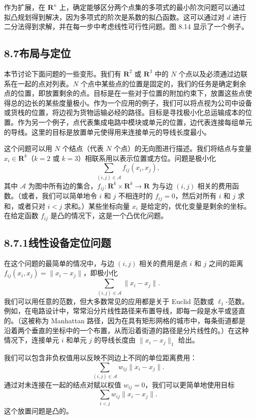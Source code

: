 \documentclass[UTF8, 12pt, fontset=fandol, oneside]{ctexart}
\begin{document}
作为扩展，在 $\mathbf{R}^n$ 上，确定能够区分两个点集的多项式的最小阶次问题可以通过拟凸规划得到解决，因为多项式的阶次是系数的拟凸函数。这可以通过对 $d$ 进行二分法得到求解，并在每一步中考虑线性可行性问题。图 8.14 显示了一个例子。

\subsection*{8.7\quad 布局与定位}

本节讨论下面问题的一些变形。我们有 $\mathbf{R}^2$ 或 $\mathbf{R}^3$ 中的 $N$ 个点以及必须通过边联系在一起的点对列表。$N$ 个点中某些点的位置是固定的，我们的任务是确定剩余点的位置，即放置剩余的点。目标是在一些对于位置的附加约束下，放置这些点使得总的边长的某些度量极小。作为一个应用的例子，我们可以将点视为公司中设备或货栈的位置，将边视为货物运输必经的路径。目标是寻找极小化总运输成本的位置。作为另一个例子，点代表集成电路中模块或单元的位置，边代表连接每组单元的导线。这里的目标是放置单元使得用来连接单元的导线长度最小。

这个问题可以用 $N$ 个结点（代表 $N$ 个点）的无向图进行描述。我们将结点与变量 $x_i\in\mathbf{R}^k$（$k=2$ 或 $k=3$）相联系用以表示位置或方位。问题是极小化
\[
\sum_{(i,j)\in\mathcal A} f_{ij}(x_i,x_j),
\]
其中 $\mathcal A$ 为图中所有边的集合，$f_{ij}:\mathbf{R}^k\times\mathbf{R}^k\to\mathbf{R}$ 为与边 $(i,j)$ 相关的费用函数。（或者，我们可以简单地令 $i$ 和 $j$ 不相连时的 $f_{ij}=0$，然后对所有 $i$ 和 $j$ 求和，或者只对 $i<j$ 求和。）某些坐标向量 $x_i$ 是给定的，优化变量是剩余的坐标。在给定函数 $f_{ij}$ 是凸的情况下，这是一个凸优化问题。

\subsection*{8.7.1\quad 线性设备定位问题}

在这个问题的最简单的情况中，与边 $(i,j)$ 相关的费用是点 $i$ 和 $j$ 之间的距离 $f_{ij}(x_i,x_j)=\|x_i-x_j\|$，即极小化
\[
\sum_{(i,j)\in\mathcal A}\|x_i-x_j\|.
\]
我们可以用任意的范数，但大多数常见的应用都是关于 Euclid 范数或 $\ell_1$-范数。例如，在电路设计中，常常沿分片线性路径来布置导线，即每一段是水平或竖直的。（这被称为 Manhattan 路径，因为在具有矩形网格的城市中，每条街道都是沿着两个垂直的坐标中的一个布置，从而沿着街道的路径是分片线性的。）在这种情况下，连接单元 $i$ 和单元 $j$ 的导线长度由 $\|x_i-x_j\|_1$ 给出。

我们可以包含非负权值用以反映不同边上不同的单位距离费用：
\[
\sum_{(i,j)\in\mathcal A} w_{ij}\|x_i-x_j\|.
\]
通过对未连接在一起的结点对赋以权值 $w_{ij}=0$，我们可以更简单地使用目标
\[
\sum_{i<j} w_{ij}\|x_i-x_j\|.
\tag{8.28}
\]
这个放置问题是凸的。
\end{document}
